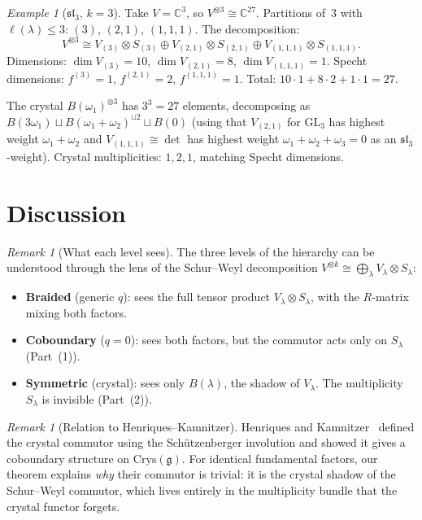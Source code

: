 \documentclass[11pt]{article}
\theoremstyle{remark}
\newtheorem{remark}[theorem]{Remark}
\newtheorem{example}[theorem]{Example}
\newcommand{\CC}{\mathbb{C}}
\newcommand{\Crys}{\mathrm{Crys}}
\newcommand{\GL}{\mathrm{GL}}
\begin{document}
\begin{example}[$\mathfrak{sl}_3$, $k = 3$]\label{ex:sl3k3}
Take $V = \CC^3$, so $V^{\otimes 3} \cong \CC^{27}$. Partitions of~$3$
with $\ell(\lambda) \leq 3$: $(3)$, $(2,1)$, $(1,1,1)$. The decomposition:
\[
  V^{\otimes 3} \cong V_{(3)} \otimes S_{(3)}
  \oplus V_{(2,1)} \otimes S_{(2,1)}
  \oplus V_{(1,1,1)} \otimes S_{(1,1,1)}.
\]
Dimensions: $\dim V_{(3)} = 10$, $\dim V_{(2,1)} = 8$,
$\dim V_{(1,1,1)} = 1$. Specht dimensions:
$f^{(3)} = 1$, $f^{(2,1)} = 2$, $f^{(1,1,1)} = 1$.
Total: $10 \cdot 1 + 8 \cdot 2 + 1 \cdot 1 = 27$. \checkmark

The crystal $B(\omega_1)^{\otimes 3}$ has $3^3 = 27$ elements, decomposing
as $B(3\omega_1) \sqcup B(\omega_1 + \omega_2)^{\sqcup 2} \sqcup B(0)$
(using that $V_{(2,1)}$ for $\GL_3$ has highest weight $\omega_1 + \omega_2$
and $V_{(1,1,1)} \cong \det$ has highest weight $\omega_1 + \omega_2 +
\omega_3 = 0$ as an $\mathfrak{sl}_3$-weight). Crystal multiplicities:
$1, 2, 1$, matching Specht dimensions.
\end{example}

\section{Discussion}

\begin{remark}[What each level sees]
The three levels of the hierarchy can be understood through the lens
of the Schur--Weyl decomposition $V^{\otimes k} \cong \bigoplus_\lambda
V_\lambda \otimes S_\lambda$:
\begin{itemize}
  \item \textbf{Braided} (generic $q$): sees the full tensor product
    $V_\lambda \otimes S_\lambda$, with the $R$-matrix mixing both factors.
  \item \textbf{Coboundary} ($q = 0$): sees both factors, but the
    commutor acts only on $S_\lambda$ (Part~(1)).
  \item \textbf{Symmetric} (crystal): sees only $B(\lambda)$, the shadow
    of $V_\lambda$. The multiplicity $S_\lambda$ is invisible (Part~(2)).
\end{itemize}
\end{remark}

\begin{remark}[Relation to Henriques--Kamnitzer]
Henriques and Kamnitzer~\cite{henriques-kamnitzer} defined the crystal
commutor using the Sch\"utzenberger involution and showed it gives a
coboundary structure on $\Crys(\mathfrak{g})$. For identical fundamental
factors, our theorem explains \emph{why} their commutor is trivial:
it is the crystal shadow of the Schur--Weyl commutor, which lives
entirely in the multiplicity bundle that the crystal functor forgets.
\end{remark}
\end{document}

